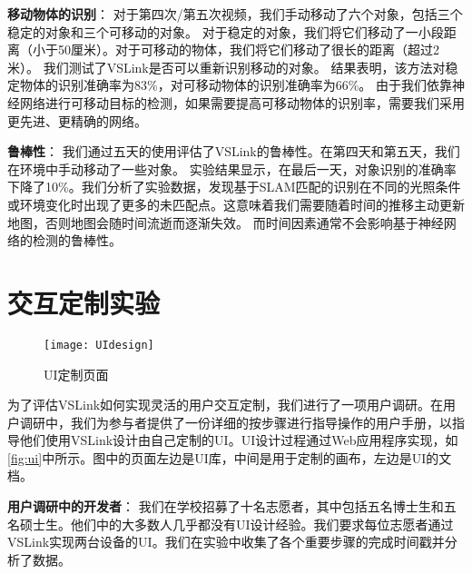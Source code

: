 \textbf{移动物体的识别}：
对于第四次/第五次视频，我们手动移动了六个对象，包括三个稳定的对象和三个可移动的对象。
对于稳定的对象，我们将它们移动了一小段距离（小于50厘米）。对于可移动的物体，我们将它们移动了很长的距离（超过2米）。
我们测试了VSLink是否可以重新识别移动的对象。
结果表明，该方法对稳定物体的识别准确率为83\%，对可移动物体的识别准确率为66\%。
由于我们依靠神经网络进行可移动目标的检测，如果需要提高可移动物体的识别率，需要我们采用更先进、更精确的网络。


\textbf{鲁棒性}：
我们通过五天的使用评估了VSLink的鲁棒性。在第四天和第五天，我们在环境中手动移动了一些对象。
实验结果显示，在最后一天，对象识别的准确率下降了10\%。我们分析了实验数据，发现基于SLAM匹配的识别在不同的光照条件或环境变化时出现了更多的未匹配点。这意味着我们需要随着时间的推移主动更新地图，否则地图会随时间流逝而逐渐失效。
而时间因素通常不会影响基于神经网络的检测的鲁棒性。



\section{交互定制实验}

\begin{figure*}[htbp]
	\centering
	\texttt{[image: UIdesign]}
	\caption{UI定制页面}
	\label{fig:ui}
\end{figure*}

为了评估VSLink如何实现灵活的用户交互定制，我们进行了一项用户调研。在用户调研中，我们为参与者提供了一份详细的按步骤进行指导操作的用户手册，以指导他们使用VSLink设计由自己定制的UI。UI设计过程通过Web应用程序实现，如\autoref{fig:ui}中所示。图中的页面左边是UI库，中间是用于定制的画布，左边是UI的文档。

\textbf{用户调研中的开发者}： 
我们在学校招募了十名志愿者，其中包括五名博士生和五名硕士生。他们中的大多数人几乎都没有UI设计经验。我们要求每位志愿者通过VSLink实现两台设备的UI。我们在实验中收集了各个重要步骤的完成时间戳并分析了数据。


